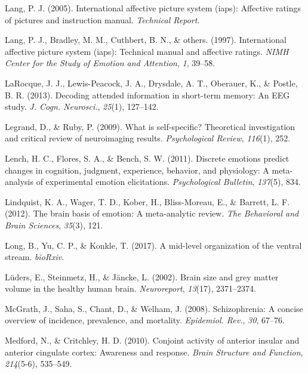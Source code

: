 \documentclass[12pt,american,a4paper,oneside,]{memoir} %
\begin{document}
\leavevmode\hypertarget{ref-lang2005international}{}%
Lang, P. J. (2005). International affective picture system (iaps): Affective ratings of pictures and instruction manual. \emph{Technical Report}.

\leavevmode\hypertarget{ref-lang1997international}{}%
Lang, P. J., Bradley, M. M., Cuthbert, B. N., \& others. (1997). International affective picture system (iaps): Technical manual and affective ratings. \emph{NIMH Center for the Study of Emotion and Attention}, \emph{1}, 39--58.

\leavevmode\hypertarget{ref-LaRocque2013-sh}{}%
LaRocque, J. J., Lewis-Peacock, J. A., Drysdale, A. T., Oberauer, K., \& Postle, B. R. (2013). Decoding attended information in short-term memory: An EEG study. \emph{J. Cogn. Neurosci.}, \emph{25}(1), 127--142.

\leavevmode\hypertarget{ref-legrand2009self}{}%
Legrand, D., \& Ruby, P. (2009). What is self-specific? Theoretical investigation and critical review of neuroimaging results. \emph{Psychological Review}, \emph{116}(1), 252.

\leavevmode\hypertarget{ref-lench2011discrete}{}%
Lench, H. C., Flores, S. A., \& Bench, S. W. (2011). Discrete emotions predict changes in cognition, judgment, experience, behavior, and physiology: A meta-analysis of experimental emotion elicitations. \emph{Psychological Bulletin}, \emph{137}(5), 834.

\leavevmode\hypertarget{ref-lindquist2012brain}{}%
Lindquist, K. A., Wager, T. D., Kober, H., Bliss-Moreau, E., \& Barrett, L. F. (2012). The brain basis of emotion: A meta-analytic review. \emph{The Behavioral and Brain Sciences}, \emph{35}(3), 121.

\leavevmode\hypertarget{ref-Long2017-fb}{}%
Long, B., Yu, C. P., \& Konkle, T. (2017). A mid-level organization of the ventral stream. \emph{bioRxiv}.

\leavevmode\hypertarget{ref-Luders2002-ms}{}%
Lüders, E., Steinmetz, H., \& Jäncke, L. (2002). Brain size and grey matter volume in the healthy human brain. \emph{Neuroreport}, \emph{13}(17), 2371--2374.

\leavevmode\hypertarget{ref-McGrath2008-oj}{}%
McGrath, J., Saha, S., Chant, D., \& Welham, J. (2008). Schizophrenia: A concise overview of incidence, prevalence, and mortality. \emph{Epidemiol. Rev.}, \emph{30}, 67--76.

\leavevmode\hypertarget{ref-medford2010conjoint}{}%
Medford, N., \& Critchley, H. D. (2010). Conjoint activity of anterior insular and anterior cingulate cortex: Awareness and response. \emph{Brain Structure and Function}, \emph{214}(5-6), 535--549.
\end{document}
